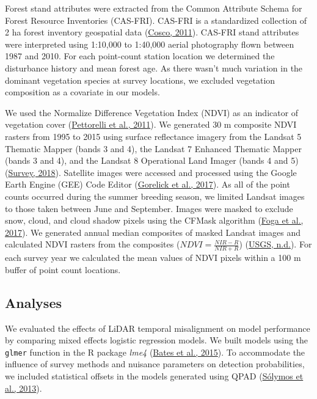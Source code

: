 \documentclass[
  12pt,
]{article}
\begin{document}
Forest stand attributes were extracted from the Common Attribute Schema for Forest Resource Inventories (CAS-FRI). CAS-FRI is a standardized collection of 2 ha forest inventory geospatial data (\protect\hyperlink{ref-Cumming2011a}{Cosco, 2011}). CAS-FRI stand attributes were interpreted using 1:10,000 to 1:40,000 aerial photography flown between 1987 and 2010. For each point-count station location we determined the disturbance history and mean forest age. As there wasn't much variation in the dominant vegetation species at survey locations, we excluded vegetation composition as a covariate in our models.

We used the Normalize Difference Vegetation Index (NDVI) as an indicator of vegetation cover (\protect\hyperlink{ref-pettorelliNormalizedDifferenceVegetation2011}{Pettorelli et al., 2011}). We generated 30 m composite NDVI rasters from 1995 to 2015 using surface reflectance imagery from the Landsat 5 Thematic Mapper (bands 3 and 4), the Landsat 7 Enhanced Thematic Mapper (bands 3 and 4), and the Landsat 8 Operational Land Imager (bands 4 and 5) (\protect\hyperlink{ref-geologicalsurveyLandsat47Surface2018}{Survey, 2018}). Satellite images were accessed and processed using the Google Earth Engine (GEE) Code Editor (\protect\hyperlink{ref-gorelickGoogleEarthEngine2017}{Gorelick et al., 2017}). As all of the point counts occurred during the summer breeding season, we limited Landsat images to those taken between June and September. Images were masked to exclude snow, cloud, and cloud shadow pixels using the CFMask algorithm (\protect\hyperlink{ref-fogaCloudDetectionAlgorithm2017}{Foga et al., 2017}). We generated annual median composites of masked Landsat images and calculated NDVI rasters from the composites (\(NDVI=\frac{NIR-R}{NIR+R}\)) (\protect\hyperlink{ref-USGS_NDVI}{USGS, n.d.}). For each survey year we calculated the mean values of NDVI pixels within a 100 m buffer of point count locations.

\hypertarget{analyses}{%
\subsection{Analyses}\label{analyses}}

We evaluated the effects of LiDAR temporal misalignment on model performance by comparing mixed effects logistic regression models. We built models using the \texttt{glmer} function in the R package \emph{lme4} (\protect\hyperlink{ref-batesFittingLinearMixedeffects2015}{Bates et al., 2015}). To accommodate the influence of survey methods and nuisance parameters on detection probabilities, we included statistical offsets in the models generated using QPAD (\protect\hyperlink{ref-SolymosMatsuoka2013}{Sólymos et al., 2013}).
\end{document}
